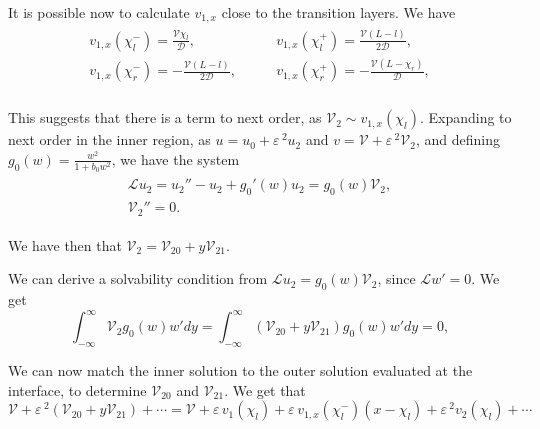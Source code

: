 \documentclass[a4paper,10pt]{article}
\newcommand{\Ep}{\ensuremath{\varepsilon\,}}
\newcommand{\DD}{\ensuremath{\mathcal{D}}}
\newcommand{\VV}{\ensuremath{\mathcal{V}}}
\newcommand{\LL}{\ensuremath{\mathcal{L}}}
\begin{document}
It is possible now to calculate $v_{1,x}$ close to the transition layers. We have
% 
\begin{equation}
\label{eqn:v1x}
\begin{split}
\begin{aligned}
  v_{1,x}(\chi_l^-) = \frac{\VV\chi_l}{\DD},\qquad &v_{1,x}(\chi_l^+) = \frac{\VV(L-l)}{2\DD},\\
  v_{1,x}(\chi_r^-) = -\frac{\VV(L-l)}{2\DD},\qquad &v_{1,x}(\chi_r^+) = -\frac{\VV(L-\chi_r)}{\DD},\\
\end{aligned}
\end{split}
\end{equation}
% 


This suggests that there is a term to next order, as $\VV_2\sim v_{1,x}(\chi_l)$. Expanding to next order in the inner region, as $u = u_0 + \Ep^2u_2$ and $v = \VV + \Ep^2\VV_2$, and defining $g_0(w) = \frac{w^2}{1+b_0w^2}$, we have the system
% 
\begin{equation}
\label{eqn:solva2}
\begin{split}
\begin{aligned}
  \LL u_2 =  u_2'' - u_2 + g_0'(w)u_2 = g_0(w)\VV_2,\\
  \VV_2'' = 0.
\end{aligned}
\end{split}
\end{equation}
% 

We have then that $\VV_2 = \VV_{20} + y\VV_{21}$. 

We can derive a solvability condition from $\LL u_2 = g_0(w)\VV_2$, since $\LL w'=0$. We get
% 
\begin{equation}
  \int_{-\infty}^{\infty}\VV_2g_0(w)w'dy = \int_{-\infty}^{\infty}(\VV_{20} + y\VV_{21})g_0(w)w'dy = 0,
\end{equation}
% 

We can now match the inner solution to the outer solution evaluated at the interface, to determine $\VV_{20}$ and $\VV_{21}$. We get that
% 
\begin{equation}
  \VV + \Ep^2(\VV_{20} + y\VV_{21}) + \cdots = \VV + \Ep v_1(\chi_l) + \Ep v_{1,x}(\chi_l^-)(x-\chi_l) + \Ep^2v_2(\chi_l)+\cdots
\end{equation}
% 
\end{document}
